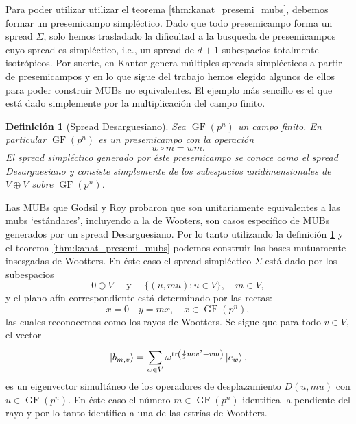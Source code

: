 \documentclass[a4paper]{report}
\DeclareMathOperator{\tr}{tr}
\DeclareMathOperator{\GF}{GF}
\newtheorem{definition}{Definición}
\begin{document}
  Para poder utilizar utilizar el teorema
  \ref{thm:kanat_presemi_mubs}, debemos formar un
  presemicampo simpléctico. Dado que todo presemicampo forma
  un spread $\Sigma$, solo hemos trasladado la dificultad a
  la busqueda de presemicampos cuyo spread es simpléctico,
  i.e., un spread de $d+1$ subespacios totalmente
  isotrópicos. Por suerte, en \cite{kantor1982} Kantor
  genera múltiples spreads simplécticos a partir de
  presemicampos y en lo que sigue del trabajo hemos elegido
  algunos de ellos para poder construir MUBs no
  equivalentes. El ejemplo más sencillo es el que está dado
  simplemente por la multiplicación del campo finito.
  \begin{definition}[Spread Desarguesiano]
    \label{def:desarguesian_semifield}
    Sea $\GF(p^{n})$ un campo finito. En particular
    $\GF(p^{n})$ es un presemicampo con la operación
    \begin{equation}
      w \circ m = w m.
    \end{equation}
    El spread simpléctico generado por éste presemicampo
    se conoce como el spread Desarguesiano y consiste
    simplemente de los subespacios unidimensionales de $V
    \oplus V$ sobre $\GF(p^{n})$.
  \end{definition}
  Las MUBs que Godsil y Roy probaron que son unitariamente
  equivalentes a las mubs `estándares', incluyendo a la de
  Wooters, son casos específico de MUBs generados por un
  spread Desarguesiano. Por lo tanto utilizando la
  definición \ref{def:desarguesian_semifield} y el teorema
  \ref{thm:kanat_presemi_mubs} podemos construir las bases
  mutuamente insesgadas de Wootters. En éste caso el spread
  simpléctico $\Sigma$ está dado por los subespacios
  \begin{equation}
    0 \oplus V
    \quad \text{ y } \quad
    \{(u,mu) : u \in V\},
    \quad m \in V,
  \end{equation}
  y el plano afín correspondiente está determinado por las
  rectas:
  \begin{equation}
    x = 0
    \quad
    y = mx,
    \quad
    x \in \GF(p^{n}),
  \end{equation}
  las cuales reconocemos como los rayos de Wootters. Se
  sigue que para todo $v \in V$, el vector
  \begin{equation}
    \ket{b_{m,v}}
    = \sum_{w \in V}^{} \omega^{\tr\left( \frac{1}{2} m w^2
    + v m\right) } \ket{e_w},
  \end{equation} 
  es un eigenvector simultáneo de los operadores de
  desplazamiento $D(u,mu)$ con $u \in \GF(p^{n})$. En éste
  caso el número $m \in \GF(p^{n})$ identifica la pendiente
  del rayo y por lo tanto identifica a una de las estrías de
  Wootters.
\end{document}
